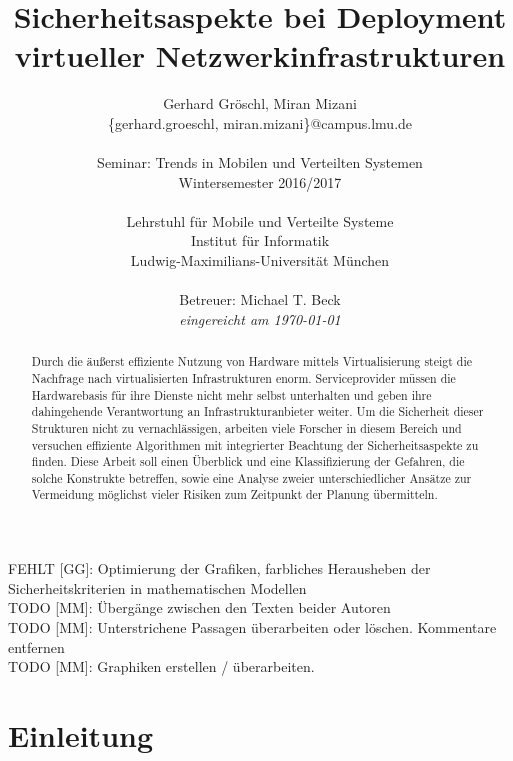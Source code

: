 \documentclass{lni}
\author{Gerhard Gröschl, Miran Mizani\\\{gerhard.groeschl, miran.mizani\}@campus.lmu.de\\\\
Seminar: Trends in Mobilen und Verteilten Systemen \\Wintersemester 2016/2017\\\\
Lehrstuhl für Mobile und Verteilte Systeme\\Institut für Informatik\\Ludwig-Maximilians-Universität München\\\\
Betreuer: Michael T. Beck\\\textit{eingereicht am \today}}
\title{Sicherheitsaspekte bei Deployment virtueller Netzwerkinfrastrukturen}
\begin{document}
\maketitle

\vfill
FEHLT [GG]: Optimierung der Grafiken, farbliches Herausheben der Sicherheitskriterien in mathematischen Modellen\\
TODO [MM]: Übergänge zwischen den Texten beider Autoren\\
TODO [MM]: Unterstrichene Passagen überarbeiten oder löschen. Kommentare entfernen\\
TODO [MM]: Graphiken erstellen / überarbeiten.

\begin{abstract}
Durch die äußerst effiziente Nutzung von Hardware mittels Virtualisierung steigt die Nachfrage nach virtualisierten Infrastrukturen enorm. Serviceprovider müssen die Hardwarebasis für ihre Dienste nicht mehr selbst unterhalten und geben ihre dahingehende Verantwortung an Infrastrukturanbieter weiter. Um die Sicherheit dieser Strukturen nicht zu vernachlässigen, arbeiten viele Forscher in diesem Bereich und versuchen effiziente Algorithmen mit integrierter Beachtung der Sicherheitsaspekte zu finden. Diese Arbeit soll einen Überblick und eine Klassifizierung der Gefahren, die solche Konstrukte betreffen, sowie eine Analyse zweier unterschiedlicher Ansätze zur Vermeidung möglichst vieler Risiken zum Zeitpunkt der Planung übermitteln.
\end{abstract}


\newpage
\tableofcontents
\newpage

\section{Einleitung}
\label{sec:Einleitung}





\end{document}
